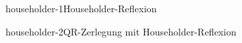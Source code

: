 \begin{Algorithmus*}{householder-1}{Householder-Reflexion}
  
\end{Algorithmus*}

\begin{Algorithmus*}{householder-2}{QR-Zerlegung mit Householder-Reflexion}
  
\end{Algorithmus*}


